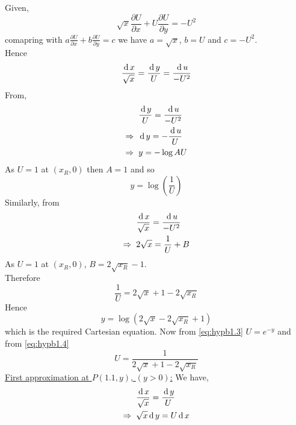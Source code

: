 \documentclass[../main-sheet.tex]{subfiles}
\begin{document}
\begin{soln}
    Given,
    \begin{equation}
        \sqrt{x}\frac{\partial U}{\partial x}+U\frac{\partial U}{\partial y}=-U^2\label{eq:hypb1.1}
    \end{equation}
    comapring with \(a\frac{\partial U}{\partial x}+b\frac{\partial U}{\partial y}=c\) we have \(a=\sqrt{x}\), \(b=U\) and \(c=-U^2\).\\
    Hence
    \begin{equation}
        \frac{\,\mathrm{d}\, x}{ \sqrt{x}}=\frac{\,\mathrm{d}\, y}{U}=\frac{\,\mathrm{d}\, u}{-U^2}\label{eq:hypb1.2}
    \end{equation}
    From,
    \begin{align*}
        &\frac{\,\mathrm{d}\, y}{U}=\frac{\,\mathrm{d}\, u}{-U^2}\\
        \Rightarrow\;\;&\,\mathrm{d}\, y=-\frac{\,\mathrm{d}\, u}{U}\\
        \Rightarrow\;\;&y=-\log A{U}
    \end{align*}
    As \(U=1\) at \((x_R,0)\) then \(A=1 \) and so
    \begin{equation}
        y=\log\left( \frac{1}{U} \right)\label{eq:hypb1.3}
    \end{equation}
    Similarly, from 
    \begin{align*}
        &\frac{\,\mathrm{d}\, x}{\sqrt{x}}=\frac{\,\mathrm{d}\, u}{-U^2}\\
        \Rightarrow\;\;&2\sqrt{x}=\frac{1}{U}+B
    \end{align*}
    As \(U=1\) at \((x_R,0)\), \(B=2\sqrt{x_R}-1\).\\
    Therefore
    \begin{equation}
        \frac{1}{U}=2\sqrt{x}+1-2\sqrt{x_R}\label{eq:hypb1.4}
    \end{equation}
    Hence 
    \begin{equation}
        y=\log(2\sqrt{x}-2\sqrt{x_R}+1)\label{eq:hypb1.5}
    \end{equation}
    which is the required Cartesian equation. Now from \eqref{eq:hypb1.3} \(U=e^{-y}\) and from \eqref{eq:hypb1.4}
    \[U=\frac{1}{2\sqrt{x}+1-2\sqrt{x_R}}\]
    \underline{First approximation at \(P(1.1,y)\), \((y>0)\):}
    We have,
    \begin{align*}
        &\frac{\,\mathrm{d}\, x}{\sqrt{x}}=\frac{\,\mathrm{d}\, y}{U}\\
        \Rightarrow\;\;&{\sqrt{x}}\,\mathrm{d}\, y=U\,\mathrm{d}\, x
    \end{align*}
    \begin{center}
\end{center}
\end{soln}
\end{document}
